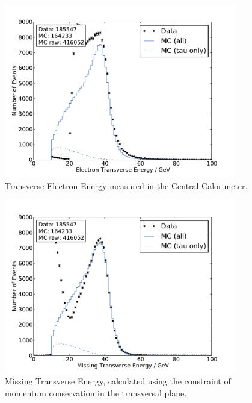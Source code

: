 \documentclass[
	paper=A4,
	parskip=full,
	chapterprefix=true,
	12pt,
	headings=normal,
	bibliography=totoc,
	listof=totoc,
	titlepage=on,
]{scrreprt}
\begin{document}
\begin{figure}[htbp]
	\centering
	\includegraphics[width=0.9\textwidth]{nocuts/E_T_el}
	\caption{Transverse Electron Energy measured in the Central Calorimeter.}
	\label{fig:no_cuts_Et}
\end{figure}
\begin{figure}[htbp]
	\centering
	\includegraphics[width=0.9\textwidth]{nocuts/E_T_miss}
	\caption{Missing Transverse Energy, calculated using the constraint of momentum conservation in the transversal plane.}
	\label{fig:no_cuts_met}
\end{figure}
\end{document}
